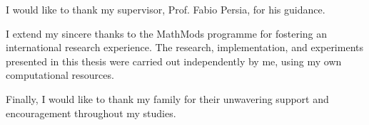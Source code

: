\documentclass[11pt, oneside, english, singlespacing, headsepline]{MastersDoctoralThesis}
\begin{document}
\begin{acknowledgements}
  \addchaptertocentry{\acknowledgementname}

  I would like to thank my supervisor, Prof. Fabio Persia, for his guidance.

  I extend my sincere thanks to the MathMods programme for fostering an international research experience. The research, implementation, and experiments presented in this thesis were carried out independently by me, using my own computational resources.

  Finally, I would like to thank my family for their unwavering support and encouragement throughout my studies.
\end{acknowledgements}


\tableofcontents %

\listoffigures %

\listoftables %







\end{document}
